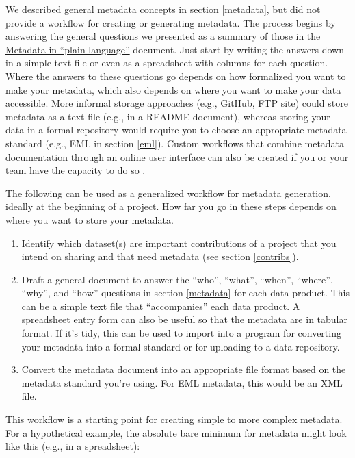\documentclass[
]{book}
\providecommand{\tightlist}{%
  \setlength{\itemsep}{0pt}\setlength{\parskip}{0pt}}
\begin{document}
We described general metadata concepts in section \ref{metadata}, but did not provide a workflow for creating or generating metadata. The process begins by answering the general questions we presented as a summary of those in the \href{https://prd-wret.s3.us-west-2.amazonaws.com/assets/palladium/production/atoms/files/Metadata\%20in\%20Plain\%20Language_508compliant.pdf}{Metadata in ``plain language''} document. Just start by writing the answers down in a simple text file or even as a spreadsheet with columns for each question. Where the answers to these questions go depends on how formalized you want to make your metadata, which also depends on where you want to make your data accessible. More informal storage approaches (e.g., GitHub, FTP site) could store metadata as a text file (e.g., in a README document), whereas storing your data in a formal repository would require you to choose an appropriate metadata standard (e.g., EML in section \ref{eml}). Custom workflows that combine metadata documentation through an online user interface can also be created if you or your team have the capacity to do so \citep{Jones07}.

The following can be used as a generalized workflow for metadata generation, ideally at the beginning of a project. How far you go in these steps depends on where you want to store your metadata.

\begin{enumerate}
\def\labelenumi{\arabic{enumi}.}
\tightlist
\item
  Identify which dataset(s) are important contributions of a project that you intend on sharing and that need metadata (see section \ref{contribs}).
\item
  Draft a general document to answer the ``who'', ``what'', ``when'', ``where'', ``why'', and ``how'' questions in section \ref{metadata} for each data product. This can be a simple text file that ``accompanies'' each data product. A spreadsheet entry form can also be useful so that the metadata are in tabular format. If it's tidy, this can be used to import into a program for converting your metadata into a formal standard or for uploading to a data repository.
\item
  Convert the metadata document into an appropriate file format based on the metadata standard you're using. For EML metadata, this would be an XML file.
\end{enumerate}

This workflow is a starting point for creating simple to more complex metadata. For a hypothetical example, the absolute bare minimum for metadata might look like this (e.g., in a spreadsheet):
\end{document}
